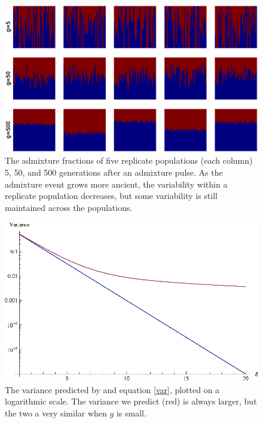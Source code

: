 \documentclass[11pt]{amsart}
\begin{document}
\newpage
\begin{figure}[htp!]
  \begin{center}
    \includegraphics[scale=.6]{ensemble.eps}
    \caption{The admixture fractions of five replicate populations (each column) 5, 50, and 500 generations after an admixture pulse. As the admixture event grows more ancient, the variability within a replicate population decreases, but some variability is still maintained across the populations.}
    \label{ensemble}
  \end{center}
\end{figure}

\newpage
\begin{figure}[htp!]
  \begin{center}
    \includegraphics[scale=1.25]{verdu_comparison.eps}
    \caption{The variance predicted by \citet{verdu2011general} and equation \ref{var}, plotted on a logarithmic scale. The variance we predict (red) is always larger, but the two a very similar when $g$ is small.}
    \label{ek2_verdu}
  \end{center}
\end{figure}
\end{document}
